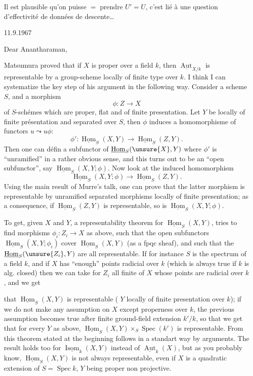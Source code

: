 Il est plausible qu'on puisse $=$ prendre $U'=U$, c'est lié à une question d'effectivité de données de descente\ldots
{}

11.9.1967

Dear Anantharaman,

Matsumura proved that if $X$ is proper over a field $k$, then $\underline{\operatorname{Aut}}_{X/k}$ is representable by a group-scheme locally of finite type over $k$. I think I can systematize the key step of his argument in the following way. Consider a scheme $S$, and a morphism
\[
\phi:Z\longrightarrow X
\]
of $S$-schémes which are proper, flat and of finite presentation. Let $Y$ be locally of finite présentation and separated over $S$, then $\phi$ induces a homomorphisme of functors $u\leadsto u\phi$:
\[
\phi':\underline{\operatorname{Hom}}_S(X,Y)\longrightarrow\underline{\operatorname{Hom}}_S(Z,Y).
\]
Then one can défin a subfunctor of $\underline{\operatorname{Hom}}_S(\unsure{X},Y)$ where $\phi'$ is ``unramified'' in a rather obvious sense, and this turns out to be an ``open subfunctor'', say $\underline{\operatorname{Hom}}_S(X,Y;\phi)$. Now look at the induced homomorphism
\[
\underline{\operatorname{Hom}}_S(X,Y;\phi)\longrightarrow\underline{\operatorname{Hom}}_S(Z,Y).
\]
Using the main result of Murre's talk, one can prove that the latter morphism is representable by unramified separated morphisms locally of finite presentation; as a consequence, if $\underline{\operatorname{Hom}}_S(Z,Y)$ is representable, so is $\underline{\operatorname{Hom}}_S(X,Y;\phi)$.

To get, given $X$ and $Y$, a representability theorem for $\underline{\operatorname{Hom}}_S(X,Y)$,  tries to find morphisms $\phi_i:Z_i\longrightarrow X$ as above, such that the open subfunctors $\underline{\operatorname{Hom}}_S(X,Y;\phi_i)$ cover $\underline{\operatorname{Hom}}_S(X,Y)$ (as a fpqc sheaf), and such that the  $\underline{\operatorname{Hom}}_S(\unsure{Z_i},Y)$ are all representable. If for instance $S$ is the spectrum of a field $k$, and if $X$ has ``enough'' points radicial over $k$ (which is always true if $k$ is alg. closed) then we can take for $Z_i$ all finite  of $X$ whose points are radicial over $k$, and we get

that $\underline{\operatorname{Hom}}_S(X,Y)$ is representable ( $Y$ locally of finite presentation  over $k$); if we do not make any assumption on $X$ except properness over $k$, the previous assumption becomes true after finite ground-field extension $k'/k$, so that we get that for every $Y$ as above, $\underline{\operatorname{Hom}}_S(X,Y)\times_S\operatorname{Spec}(k')$ is representable. From this  theorem stated at the beginning follows in a standart way by  arguments. The result holds too for $\underline{\operatorname{Isom}}_k(X,Y)$ instead of $\underline{\operatorname{Aut}}_k(X)$, but as you probably know, $\underline{\operatorname{Hom}}_S(X,Y)$ is not always representable, even if $X$ is a quadratic extension of $S=\operatorname{Spec}k$, $Y$ being proper non projective.

